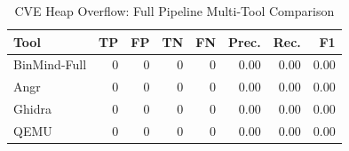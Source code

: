 \begin{table}[htbp]
\centering
\caption{CVE Heap Overflow: Full Pipeline Multi-Tool Comparison}
\label{tab:cve-full-comparison}
\begin{tabular}{lrrrrrrr}
\toprule
Tool & TP & FP & TN & FN & Prec. & Rec. & F1 \\
\midrule
BinMind-Full & 0 & 0 & 0 & 0 & 0.00 & 0.00 & 0.00 \\
Angr & 0 & 0 & 0 & 0 & 0.00 & 0.00 & 0.00 \\
Ghidra & 0 & 0 & 0 & 0 & 0.00 & 0.00 & 0.00 \\
QEMU & 0 & 0 & 0 & 0 & 0.00 & 0.00 & 0.00 \\
\bottomrule
\end{tabular}
\end{table}
